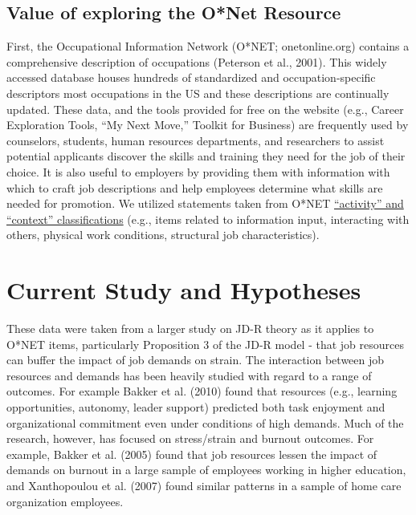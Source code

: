 \documentclass[
  english,
  man]{apa6}
\begin{document}
\hypertarget{value-of-exploring-the-onet-resource}{%
\subsection{Value of exploring the O*Net Resource}\label{value-of-exploring-the-onet-resource}}

First, the Occupational Information Network (O*NET; onetonline.org) contains a comprehensive description of occupations (Peterson et al., 2001). This widely accessed database houses hundreds of standardized and occupation-specific descriptors most occupations in the US and these descriptions are continually updated. These data, and the tools provided for free on the website (e.g., Career Exploration Tools, ``My Next Move,'' Toolkit for Business) are frequently used by counselors, students, human resources departments, and researchers to assist potential applicants discover the skills and training they need for the job of their choice. It is also useful to employers by providing them with information with which to craft job descriptions and help employees determine what skills are needed for promotion. We utilized statements taken from O*NET \href{https://www.O*NETonline.org/find/descriptor/result/4.A.1.b.3}{``activity'' and ``context'' classifications} (e.g., items related to information input, interacting with others, physical work conditions, structural job characteristics).

\hypertarget{current-study-and-hypotheses}{%
\section{Current Study and Hypotheses}\label{current-study-and-hypotheses}}

These data were taken from a larger study on JD-R theory as it applies to O*NET items, particularly Proposition 3 of the JD-R model - that job resources can buffer the impact of job demands on strain. The interaction between job resources and demands has been heavily studied with regard to a range of outcomes. For example Bakker et al. (2010) found that resources (e.g., learning opportunities, autonomy, leader support) predicted both task enjoyment and organizational commitment even under conditions of high demands. Much of the research, however, has focused on stress/strain and burnout outcomes. For example, Bakker et al. (2005) found that job resources lessen the impact of demands on burnout in a large sample of employees working in higher education, and Xanthopoulou et al. (2007) found similar patterns in a sample of home care organization employees.
\end{document}
